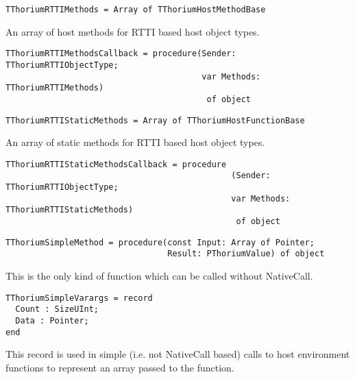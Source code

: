 \begin{verbatim}
TThoriumRTTIMethods = Array of TThoriumHostMethodBase
\end{verbatim}
\label{thoriumcorepkg:thorium:tthoriumrttimethods}
An array of host methods for RTTI based host object types.


\begin{verbatim}
TThoriumRTTIMethodsCallback = procedure(Sender: TThoriumRTTIObjectType;
                                        var Methods: TThoriumRTTIMethods)
                                         of object
\end{verbatim}
\label{thoriumcorepkg:thorium:tthoriumrttimethodscallback}



\begin{verbatim}
TThoriumRTTIStaticMethods = Array of TThoriumHostFunctionBase
\end{verbatim}
\label{thoriumcorepkg:thorium:tthoriumrttistaticmethods}
An array of static methods for RTTI based host object types.


\begin{verbatim}
TThoriumRTTIStaticMethodsCallback = procedure
                                              (Sender: TThoriumRTTIObjectType;
                                              var Methods: TThoriumRTTIStaticMethods)
                                               of object
\end{verbatim}
\label{thoriumcorepkg:thorium:tthoriumrttistaticmethodscallback}



\begin{verbatim}
TThoriumSimpleMethod = procedure(const Input: Array of Pointer;
                                 Result: PThoriumValue) of object
\end{verbatim}
\label{thoriumcorepkg:thorium:tthoriumsimplemethod}
This is the only kind of function which can be called without NativeCall.


\begin{verbatim}
TThoriumSimpleVarargs = record
  Count : SizeUInt;
  Data : Pointer;
end

\end{verbatim}
\label{thoriumcorepkg:thorium:tthoriumsimplevarargs}
This record is used in simple (i.e. not NativeCall based) calls to host environment functions to represent an array passed to the function.


